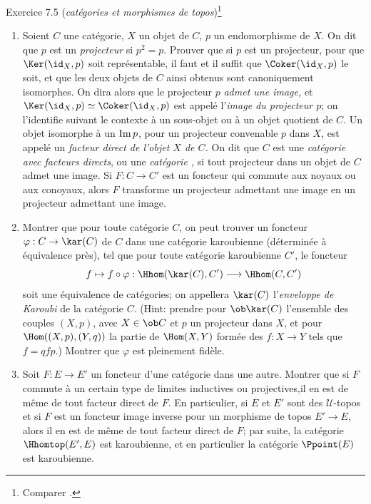 \documentclass[10pt]{../fichiers-configuration-latex/smfart}
\begin{document}
\begin{enonce*}[remark]{Exercice 7.5}
(\emph{catégories\pageoriginale {} et morphismes de
topos})\footnote[1]{Comparer .}
\begin{enumerate}
\renewcommand{\theenumi}{\alph{enumi}}
\renewcommand{\labelenumi}{\theenumi)}
\item Soient $C$ une catégorie, $X$ un objet de $C$, $p$ un
endomorphisme de $X$. On dit que $p$ est un \emph{projecteur} si
$p^2=p$. Prouver que si $p$ est un projecteur, pour que
$\Ker(\id_X,p)$ soit représentable, il faut et il suffit que
$\Coker(\id_X,p)$ le soit, et que les deux objets de $C$ ainsi
obtenus sont canoniquement isomorphes. On dira alors que le
projecteur $p$ \emph{admet une image,} et $\Ker(\id_X,p)\simeq
\Coker(\id_X,p)$ est appelé l'\emph{image du projecteur $p$}; on
l'identifie suivant le contexte à un sous-objet ou à un objet
quotient de $C$. Un objet isomorphe à un $\text{Im\,} p$, pour un
projecteur convenable $p$ dans $X$, est appelé un \emph{facteur
direct de l'objet $X$ de $C$.} On dit que $C$ est une
\emph{catégorie avec facteurs directs}, ou une \emph{catégorie
,} si tout projecteur dans un objet de $C$ admet une
image. Si $F:C\rightarrow C'$ est un foncteur qui commute aux noyaux
ou aux conoyaux, alors $F$ transforme un projecteur admettant une
image en un projecteur admettant une image.

\item Montrer que pour toute catégorie $C$, on peut trouver un
foncteur $\varphi:C\rightarrow \kar (C)$ de $C$ dans une catégorie
karoubienne (déterminée à équivalence près), tel que pour toute
catégorie karoubienne $C'$, le foncteur
$$
f\mapsto f\circ \varphi:\Hhom(\kar(C),C')\longrightarrow \Hhom(C,C')
$$
soit une équivalence de catégories; on appellera $\kar(C)$
l'\emph{enveloppe de Karoubi} de la catégorie $C$. (Hint: prendre
pour $\ob \kar (C)$ l'ensemble des couples $(X,p)$, avec $X\in \ob
C$ et $p$ un projecteur dans $X$, et pour $\Hom((X,p),(Y,q))$ la
partie de $\Hom(X,Y)$ formée des $f:X\rightarrow Y$ tels que
$f=qfp.$) Montrer que $\varphi$ est pleinement fidèle.

\item Soit $F:E\rightarrow E'$ un foncteur d'une catégorie dans une
autre. Montrer que si $F$ commute à un certain type de limites
inductives ou projectives,\pageoriginale il en est de même de tout
facteur direct de $F$. En particulier, si $E$ et $E'$ sont des
$𝒰$-topos et si $F$ est un foncteur image inverse pour un
morphisme de topos $E'\rightarrow E$, alors il en est de même de
tout facteur direct de $F$; par suite, la catégorie $\Hhomtop(E',E)$
est karoubienne, et en particulier la catégorie $\Ppoint(E)$ est
karoubienne.


\end{enumerate}
\end{enonce*}
\end{document}
